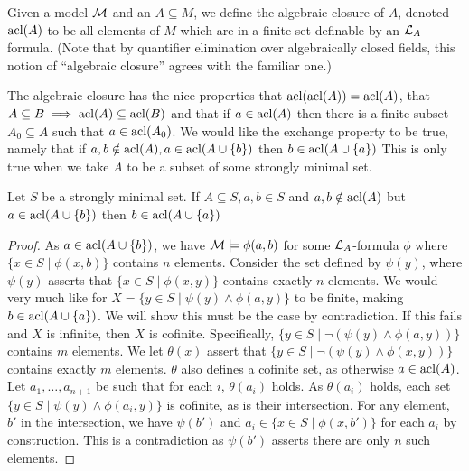 \begin{definition}\label{definition_algebraic_closure}
Given a model \(\mathcal{M}\) and an \(A \subseteq M\), we define the algebraic closure of \(A\), denoted \(\text{acl}(A)\) to be all elements of \(M\) which are in a finite set definable by an \(\mathcal{L}_A\)-formula. 
(Note that by quantifier elimination over algebraically closed fields, this notion of ``algebraic closure'' agrees with the familiar one.)
\end{definition}

The algebraic closure has the nice properties that \(\text{acl}(\text{acl}(A)) = \text{acl}(A)\), that \(A \subseteq B \implies \text{acl}(A) \subseteq \text{acl}(B)\) and that if \(a \in \text{acl}(A)\) then there is a finite subset \(A_0 \subseteq A\) such that \(a \in \text{acl}(A_0)\).
We would like the exchange property to be true, namely that if \(a, b \notin \text{acl}(A), a \in \text{acl}(A \cup \{b\})\) then \(b \in \text{acl}(A \cup \{a\})\) 
This is only true when we take \(A\) to be a subset of some strongly minimal set.

\begin{theorem}\label{theorem_exchange}
Let \(S\) be a strongly minimal set. If \(A \subseteq S, a, b \in S\) and \(a, b \notin \text{acl}(A)\) but \(a \in \text{acl}(A \cup \{b\})\) then \(b \in \text{acl}(A \cup \{a\})\) 
\end{theorem}


\begin{proof}
As \(a \in \text{acl}(A \cup \{b\})\), we have \(\mathcal{M} \models \phi(a, b)\) for some \(\mathcal{L}_A\)-formula 
\(\phi\) where \(\{x \in S \mid \phi(x, b)\}\) contains \(n\) elements. 
Consider the set defined by \(\psi(y)\), where \(\psi(y)\) asserts that \(\{x \in S \mid \phi(x, y)\}\) contains exactly \(n\) elements. 
We would very much like for \(X = \{y \in S \mid \psi(y) \land \phi(a, y)\}\) to be finite, making \(b \in \text{acl}(A \cup \{a\})\). 
We will show this must be the case by contradiction.
If this fails and \(X\) is infinite, then \(X\) is cofinite. 
Specifically, \(\{y \in S \mid \neg(\psi(y) \land \phi(a, y))\}\) contains \(m\) elements.  
We let \(\theta(x)\) assert that \(\{y \in S \mid \neg(\psi(y) \land \phi(x, y))\}\) contains exactly \(m\) elements.
\(\theta\) also defines a cofinite set, as otherwise \(a \in \text{acl}(A)\).   
Let \(a_1, \ldots, a_{n+1}\) be such that for each \(i\), \(\theta(a_i)\) holds.
As \(\theta(a_i)\) holds, each set \(\{y \in S \mid \psi(y) \land \phi(a_i, y)\}\) is cofinite, as is their intersection. 
For any element, \(b'\) in the intersection, we have \(\psi(b')\) and \(a_i \in \{x \in S \mid \phi(x, b')\}\) for each \(a_i\) by construction.
This is a contradiction as \(\psi(b')\) asserts there are only \(n\) such elements.  
\end{proof}

